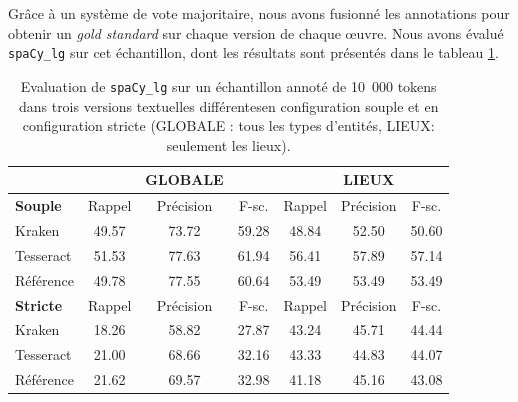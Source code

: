 Grâce à un système de vote majoritaire, nous avons fusionné les annotations pour obtenir un \textit{gold standard} sur chaque version de chaque œuvre.
 Nous avons évalué \texttt{spaCy\_lg} sur cet échantillon, dont les résultats sont présentés dans le tableau \ref{tab:eval-supervise}. 
 
\begin{table}[h!]
\centering
\scriptsize{\begin{tabular}{l|ccc|ccc}
 &		&	GLOBALE	&		&		&	LIEUX	&		\\
\hline
 \hline
\textbf{Souple}	&	Rappel		&Précision	&	F-sc.	&	Rappel&		Précision		&F-sc.	\\
 \hline
Kraken	&	49.57	&	73.72 	&	59.28	&	48.84	&	52.50	&	50.60	\\
													
Tesseract	&	51.53	&	77.63	&	61.94	&	56.41	&	57.89	&	57.14	\\
													
Référence	&	49.78	&	77.55	&	60.64	&	53.49	&	53.49	&	53.49	\\
\hline
\hline
\textbf{Stricte}	&	Rappel		&Précision	&	F-sc.	&	Rappel&		Précision		&F-sc.	 \\
\hline
Kraken	&	18.26	&	58.82	&	27.87	&	43.24	&	45.71	&	44.44	\\
Tesseract	&	21.00	&	68.66	&	32.16	&	43.33	&	44.83	&	44.07	\\
Référence	&	21.62	&	69.57	&	32.98	&	41.18	&	45.16	&	43.08	\\
\hline
\hline
\end{tabular}}
\caption{Evaluation de \texttt{spaCy\_lg} sur un échantillon annoté de 10~000 tokens dans trois versions textuelles différentes\label{tab:eval-supervise} en configuration souple et en configuration stricte (GLOBALE : tous les types d'entités, LIEUX: seulement les lieux).}
 \end{table}

